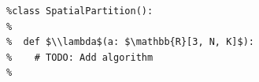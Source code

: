 \documentclass[border=10pt]{standalone}
\begin{document}
\begin{lstlisting}
%class SpatialPartition():
%
%  def $\\lambda$(a: $\mathbb{R}[3, N, K]$):
%    # TODO: Add algorithm
%
\end{lstlisting}
\end{document}
